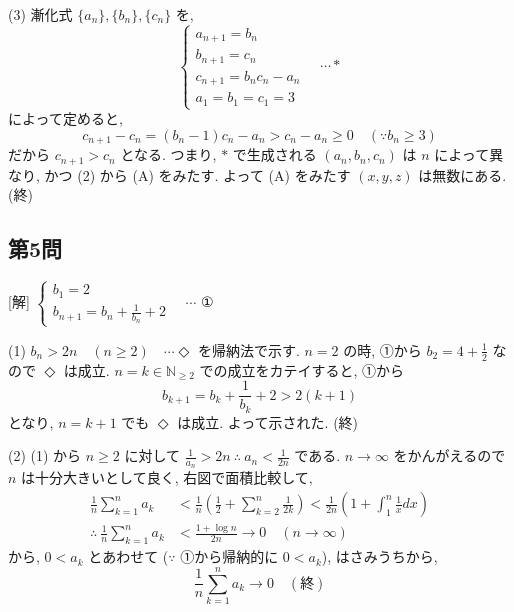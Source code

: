 \documentclass[../main.tex]{subfiles}
\begin{document}
(3) 漸化式 $\{a_n\}, \{b_n\}, \{c_n\}$ を,
\[
  \begin{cases} a_{n+1} = b_n \\ b_{n+1} = c_n \\ c_{n+1} = b_n c_n - a_n \\ a_1 = b_1 = c_1 = 3
\end{cases} \quad \cdots * \]
によって定めると,
\[ c_{n+1} - c_n = (b_n - 1)c_n - a_n > c_n - a_n \ge 0 \quad (\because b_n \ge 3) \]
だから $c_{n+1} > c_n$ となる. つまり, $*$ で生成される $(a_n, b_n, c_n)$ は $n$ によって異なり, かつ (2) から (A) をみたす. よって (A) をみたす $(x, y, z)$ は無数にある. (終)

\subsection*{第5問}
[解] $
\begin{cases} b_1 = 2 \\ b_{n+1} = b_n + \frac{1}{b_n} + 2
\end{cases} \quad \cdots$ ①

(1) $b_n > 2n \quad (n \ge 2) \quad \cdots \Diamond$ を帰納法で示す. $n=2$ の時, ①から $b_2 = 4 + \frac{1}{2}$ なので $\Diamond$ は成立. $n=k \in \mathbb{N}_{\ge 2}$ での成立をカテイすると, ①から
\[ b_{k+1} = b_k + \frac{1}{b_k} + 2 > 2(k + 1) \]
となり, $n=k+1$ でも $\Diamond$ は成立. よって示された. (終)

(2) (1) から $n \ge 2$ に対して $\frac{1}{a_n} > 2n \ \therefore \ a_n < \frac{1}{2n}$ である. $n \to \infty$ をかんがえるので $n$ は十分大きいとして良く, 右図で面積比較して,
\begin{align*}
  \frac{1}{n} \sum_{k=1}^n a_k &< \frac{1}{n} \left( \frac{1}{2} + \sum_{k=2}^n \frac{1}{2k} \right) < \frac{1}{2n} \left( 1 + \int_1^n \frac{1}{x} dx \right) \\
  \therefore \ \frac{1}{n} \sum_{k=1}^n a_k &< \frac{1 + \log n}{2n} \to 0 \quad (n \to \infty)
\end{align*}
から, $0 < a_k$ とあわせて ($\because$ ①から帰納的に $0 < a_k$), はさみうちから,
\[ \frac{1}{n} \sum_{k=1}^n a_k \to 0 \quad (\text{終}) \]

\begin{center}
\end{center}
\end{document}
